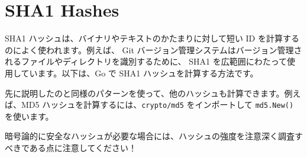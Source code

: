 \section{SHA1 Hashes}

SHA1 ハッシュは、バイナリやテキストのかたまりに対して短い ID を計算するのによく使われます。例えば、 Git バージョン管理システムはバージョン管理されるファイルやディレクトリを識別するために、 SHA1 を広範囲にわたって使用しています。以下は、Go で SHA1 ハッシュを計算する方法です。




先に説明したのと同様のパターンを使って、他のハッシュも計算できます。例えば、MD5 ハッシュを計算するには、\texttt{crypto/md5} をインポートして \texttt{md5.New()} を使います。

暗号論的に安全なハッシュが必要な場合には、ハッシュの強度を注意深く調査すべきである点に注意してください！